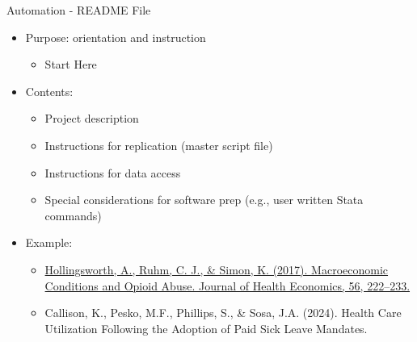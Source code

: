 \documentclass{beamer}
\begin{document}
\begin{frame}{Automation - README File}
    \begin{itemize}
        \item Purpose: orientation and instruction
            \begin{itemize}
                \item Start Here
            \end{itemize}
        \item Contents:
            \begin{itemize}
                \item Project description
                \item Instructions for replication (master script file)
                \item Instructions for data access
                \item Special considerations for software prep (e.g., user written Stata commands)
            \end{itemize}
        \item Example:
            \begin{itemize}
                \item \color{blue} \href{https://github.com/hollina/macroeconomic_conditions_and_opioid_abuse}{Hollingsworth, A., Ruhm, C. J., \& Simon, K. (2017). Macroeconomic Conditions and Opioid Abuse. Journal of Health Economics, 56, 222–233.}
                \item Callison, K., Pesko, M.F., Phillips, S., \& Sosa, J.A. (2024). Health Care Utilization Following the Adoption of Paid Sick Leave Mandates. 
            \end{itemize}
    \end{itemize}
\end{frame}
\end{document}
